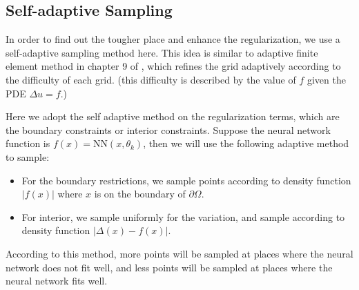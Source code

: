 \documentclass{article}
\begin{document}
\subsection{Self-adaptive Sampling}
\par In order to find out the tougher place and enhance the regularization, we use a self-adaptive sampling method here. This idea is similar to adaptive finite element method in chapter 9 of \cite{brenner2007mathematical}, which refines the grid adaptively according to the difficulty of each grid. (this difficulty is described by the value of $f$ given the PDE $\Delta u = f$.) 
\par Here we adopt the self adaptive method on the regularization terms, which are the boundary constraints or interior constraints. Suppose the neural network function is $f(x) = \mathrm{NN}(x, \theta_k)$, then we will use the following adaptive method to sample:
\begin{itemize}
	\item For the boundary restrictions, we sample points according to density function $|f(x)|$ where $x$ is on the boundary of $\partial\Omega$.
	\item For interior, we sample uniformly for the variation, and sample according to density function $|\Delta(x) - f(x)|$.
\end{itemize}
\par  According to this method, more points will be sampled at places where the neural network does not fit well, and less points will be sampled at places where the neural network fits well. 
\end{document}
